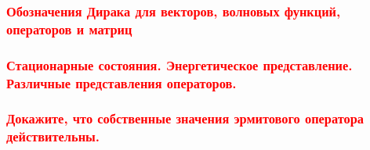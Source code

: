 \subsubsection{\textcolor{red} {Обозначения Дирака для векторов, волновых функций, операторов и матриц} }

\subsubsection{\textcolor{red} {Стационарные состояния. Энергетическое представление. Различные представления операторов. }}

\subsubsection{\textcolor{red} {Докажите, что собственные значения эрмитового оператора действительны.} }

